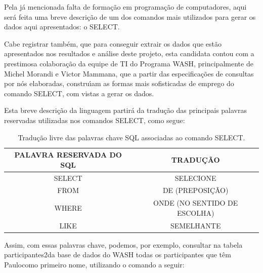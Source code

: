 \documentclass[
12pt,		%
openright,	%
twoside,  %
a4paper,			%
chapter=TITLE,		%
english,			%
french,				%
spanish,			%
brazil				%
]{USPSC-classe/USPSC}
\begin{document}
Pela j\'a mencionada falta de forma\c{c}\~ao em programa\c{c}\~ao de computadores, aqui ser\'a feita uma breve descri\c{c}\~ao de um dos comandos mais utilizados para gerar os dados aqui apresentados: o SELECT.









Cabe registrar tamb\'em, que para conseguir extrair os dados que est\~ao apresentados nos resultados e an\'alise deste projeto, esta candidata contou com a prestimosa colabora\c{c}\~ao da equipe de TI do Programa WASH, principalmente de Michel Morandi e Victor Mammana, que a partir das especifica\c{c}\~oes de consultas por n\'os elaboradas, constru\'{\i}am as formas mais sofisticadas de emprego do comando SELECT, com vistas a gerar os dados.









Esta breve descri\c{c}\~ao da linguagem partir\'a da tradu\c{c}\~ao das principais palavras reservadas utilizadas nos comandos SELECT, como segue:













\begin{table}[htb]
\tiny
\caption{\label{4b66144149fcef1c5bff55ce7a2ed8760dc3fe3a}Tradu\c{c}\~ao livre das palavras chave SQL associadas ao comando SELECT.}

\centering
\begin{tabular}{|c|c|}
\hline
PALAVRA RESERVADA DO SQL  &  TRADU\c{C}\~AO \\
\hline
SELECT  &  SELECIONE \\
FROM  &  DE (PREPOSI\c{C}\~AO) \\
WHERE  &  ONDE (NO SENTIDO DE ESCOLHA) \\
LIKE  &  SEMELHANTE \\
\hline
\end{tabular}
\end{table}


Assim, com essas palavras chave, podemos, por exemplo, consultar na tabela \textquotedbl participantes2\textquotedbl  da base de dados do WASH todas os participantes que t\^em \textquotedbl Paulo\textquotedbl  como primeiro nome, utilizando o comando a seguir:
\end{document}
